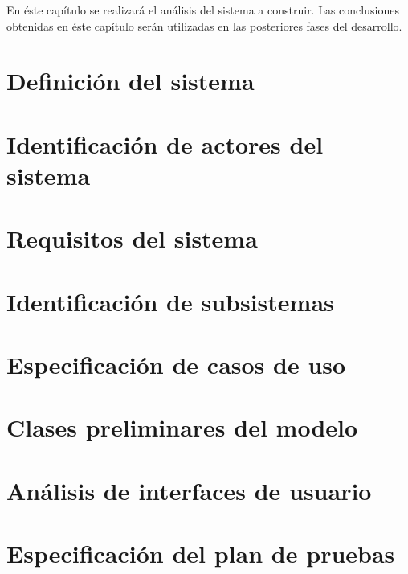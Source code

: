 En éste capítulo se realizará el análisis del sistema a construir.  Las conclusiones obtenidas en éste capítulo serán utilizadas en las posteriores fases del desarrollo.

\section{Definición del sistema}
\label{definicion_sistema}



\section{Identificación de actores del sistema}
\label{identificacion_actores}



\section{Requisitos del sistema}
\label{requisitos_sistema}



\section{Identificación de subsistemas}
\label{identificacion_subsistemas}



\section{Especificación de casos de uso}
\label{especificacion_casos_uso}



\section{Clases preliminares del modelo}
\label{clases_preliminares_modelo}



\section{Análisis de interfaces de usuario}
\label{analisis_interfaces_usuario}



\section{Especificación del plan de pruebas}
\label{especificacion_plan_pruebas}
